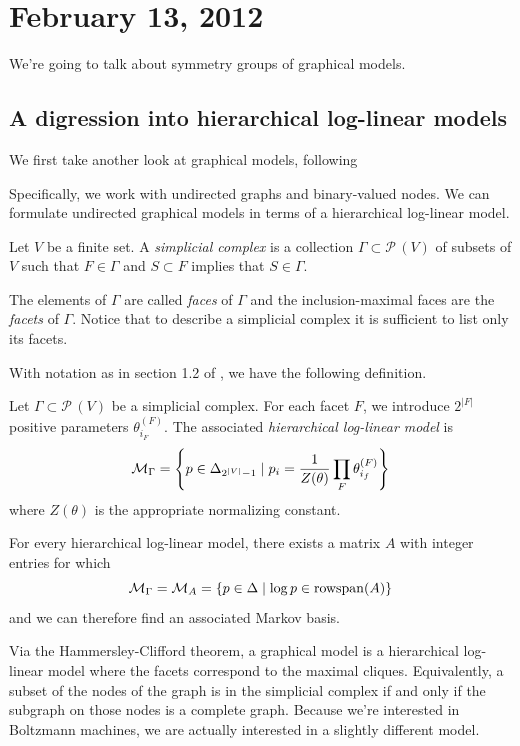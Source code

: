 \documentclass[12pt]{article}
\newcommand*{\ms}{\mathcal{M}}
\newcommand*{\ps}{\mathcal{P}\,}
\begin{document}
\section{February 13, 2012}

We're going to talk about symmetry groups of graphical models.  

\subsection{A digression into hierarchical log-linear models}
We first take
another look at graphical models, following \cite{DSS09}

Specifically, we work with undirected graphs and binary-valued nodes.  We can
formulate undirected graphical models in terms of a hierarchical log-linear
model.

\begin{definition}
    Let $V$ be a finite set.  A \emph{simplicial complex} is a collection
    $\Gamma \subset \ps(V)$ of subsets of $V$ such that $F \in \Gamma$ and $S
    \subset F$ implies that $S \in \Gamma$.  
\end{definition}
The elements of $\Gamma$ are called \emph{faces} of $\Gamma$ and the
inclusion-maximal faces are the \emph{facets} of $\Gamma$.  Notice that to
describe a simplicial complex it is sufficient to list only its facets.

With notation as in section 1.2 of \cite{DSS09}, we have the following
definition.

\begin{definition}
    Let $\Gamma \subset \ps(V)$ be a simplicial complex.  For each facet $F$, we
    introduce $2^{|F|}$ positive parameters $\theta_{i_F}^{(F)}$.  The
    associated \emph{hierarchical log-linear model} is
    \[
        \ms_\Gamma = \cdel*{p \in \Delta_{2^{|V|} - 1}
            \mid p_i = \frac{1}{Z(\theta)} \prod_{F} \theta_{i_f}^{(F)}
        }
    \]
    where $Z(\theta)$ is the appropriate normalizing constant.
\end{definition}

For every hierarchical log-linear model, there exists a matrix $A$ with integer
entries for which
\[
    \ms_\Gamma = \ms_A = \cdel*{
        p \in \Delta \mid \log p \in \mathrm{rowspan}(A)
    }
\]
and we can therefore find an associated Markov basis.

Via the Hammersley-Clifford theorem, a graphical model is a hierarchical
log-linear model where the facets correspond to the maximal cliques.
Equivalently, a subset of the nodes of the graph is in the simplicial complex if
and only if the subgraph on those nodes is a complete graph.
Because we're interested in Boltzmann machines, we are actually interested in a
slightly different model.
\end{document}

